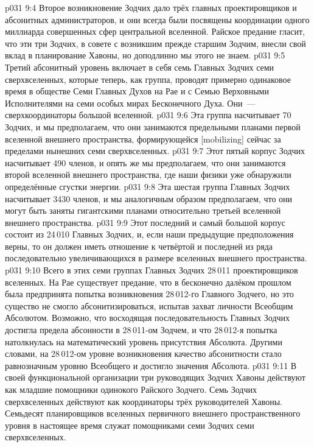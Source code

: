 \vs p031 9:4  Второе возникновение Зодчих дало трёх главных проектировщиков и абсонитных администраторов, и они всегда были посвящены координации одного миллиарда совершенных сфер центральной вселенной. Райское предание гласит, что эти три Зодчих, в совете с возникшим прежде старшим Зодчим, внесли свой вклад в планирование Хавоны, но доподлинно мы этого не знаем.
\vs p031 9:5  Третий абсонитный уровень включает в себя семь Главных Зодчих семи сверхвселенных, которые теперь, как группа, проводят примерно одинаковое время в обществе Семи Главных Духов на Рае и с Семью Верховными Исполнителями на семи особых мирах Бесконечного Духа. Они~--- сверхкоординаторы большой вселенной.
\vs p031 9:6  Эта группа насчитывает 70 Зодчих, и мы предполагаем, что они занимаются предельными планами первой вселенной внешнего пространства, формирующейся [mobilizing] сейчас за пределами нынешних семи сверхвселенных.
\vs p031 9:7  Этот пятый корпус Зодчих насчитывает 490 членов, и опять же мы предполагаем, что они занимаются второй вселенной внешнего пространства, где наши физики уже обнаружили определённые сгустки энергии.
\vs p031 9:8  Эта шестая группа Главных Зодчих насчитывает 3430 членов, и мы аналогичным образом предполагаем, что они могут быть заняты гигантскими планами относительно третьей вселенной внешнего пространства.
\vs p031 9:9  Этот последний и самый большой корпус состоит из 24\,010 Главных Зодчих, и, если наши предыдущие предположения верны, то он должен иметь отношение к четвёртой и последней из ряда последовательно увеличивающихся в размере вселенных внешнего пространства.
\vs p031 9:10 \pc Всего в этих семи группах Главных Зодчих 28\,011 проектировщиков вселенных. На Рае существует предание, что в бесконечно далёком прошлом была предпринята попытка возникновения 28\,012\hyp{}го Главного Зодчего, но это существо не смогло абсонитизироваться, испытав захват личности Всеобщим Абсолютом. Возможно, что восходящая последовательность Главных Зодчих достигла предела абсонности в 28\,011\hyp{}ом Зодчем, и что 28\,012\hyp{}я попытка натолкнулась на математический уровень присутствия Абсолюта. Другими словами, на 28\,012\hyp{}ом уровне возникновения качество абсонитности стало равнозначным уровню Всеобщего и достигло значения Абсолюта.
\vs p031 9:11 \pc В своей функциональной организации три руководящих Зодчих Хавоны действуют как младшие помощники одинокого Райского Зодчего. Семь Зодчих сверхвселенных действуют как координаторы трёх руководителей Хавоны. Семьдесят планировщиков вселенных первичного внешнего пространственного уровня в настоящее время служат помощниками семи Зодчих семи сверхвселенных.
